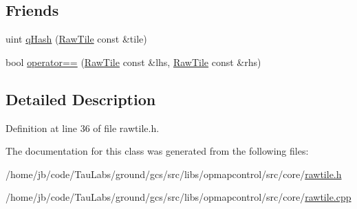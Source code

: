 \subsection*{\-Friends}
\begin{DoxyCompactItemize}
\item 
uint \hyperlink{group___o_p_map_widget_ga7b7411b1b50d2977c787264eb948910a}{q\-Hash} (\hyperlink{classcore_1_1_raw_tile}{\-Raw\-Tile} const \&tile)
\item 
bool \hyperlink{group___o_p_map_widget_ga7b53343b44511baed2e1587fdd5c88aa}{operator==} (\hyperlink{classcore_1_1_raw_tile}{\-Raw\-Tile} const \&lhs, \hyperlink{classcore_1_1_raw_tile}{\-Raw\-Tile} const \&rhs)
\end{DoxyCompactItemize}


\subsection{\-Detailed \-Description}


\-Definition at line 36 of file rawtile.\-h.



\-The documentation for this class was generated from the following files\-:\begin{DoxyCompactItemize}
\item 
/home/jb/code/\-Tau\-Labs/ground/gcs/src/libs/opmapcontrol/src/core/\hyperlink{rawtile_8h}{rawtile.\-h}\item 
/home/jb/code/\-Tau\-Labs/ground/gcs/src/libs/opmapcontrol/src/core/\hyperlink{rawtile_8cpp}{rawtile.\-cpp}\end{DoxyCompactItemize}
